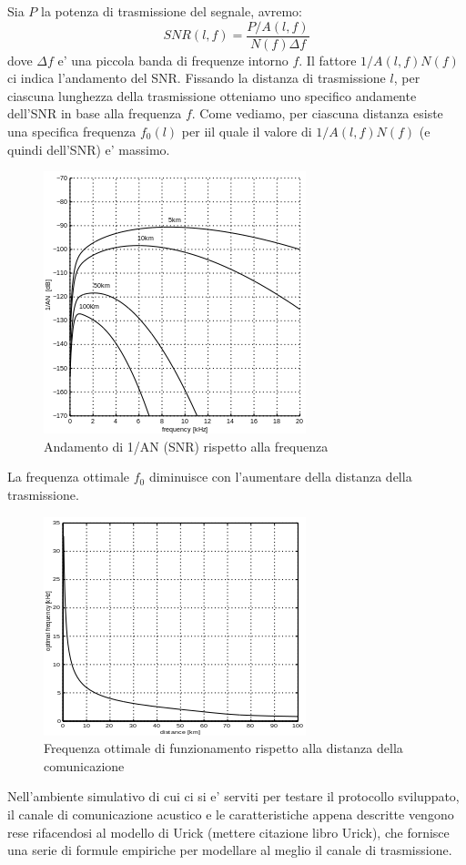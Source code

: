 Sia $P$ la potenza di trasmissione del segnale, avremo:
\[SNR(l, f) = \frac{P/A(l, f)}{N(f)\Delta f}\]
dove $\Delta f $ e' una piccola banda di frequenze intorno $f$. Il fattore $1/A(l, f)N(f)$ ci indica l'andamento del SNR. Fissando la distanza di trasmissione $l$, per ciascuna lunghezza della trasmissione otteniamo uno specifico andamente dell'SNR in base alla frequenza $f$. Come vediamo, per ciascuna distanza esiste una specifica frequenza $f_0(l)$ per iil quale il valore di $1/A(l, f)N(f)$ (e quindi dell'SNR) e' massimo.
\begin{figure}[H]
\centering
    \includegraphics[]{snr.png}
    \caption{Andamento di 1/AN (SNR) rispetto alla frequenza}
\end{figure}

La frequenza ottimale $f_0$ diminuisce con l'aumentare della distanza della trasmissione.
\begin{figure}[H]
    \centering
    \includegraphics[]{optimalfreq.png}
    \caption{Frequenza ottimale di funzionamento rispetto alla distanza della comunicazione}
\end{figure}
\par
Nell'ambiente simulativo di cui ci si e' serviti per testare il protocollo sviluppato, il canale di comunicazione acustico e le caratteristiche appena descritte vengono rese rifacendosi al modello di Urick (mettere citazione libro Urick), che fornisce una serie di formule empiriche per modellare al meglio il canale di trasmissione.

